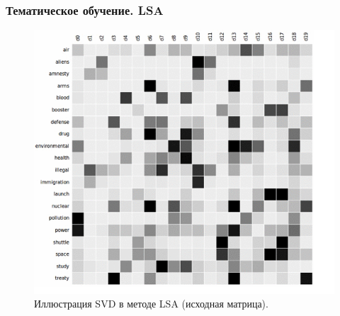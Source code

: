 \documentclass[ucs, notheorems, handout]{beamer}
\begin{document}
		\begin{frame}
	\frametitle{Тематическое обучение. LSA}
	

\begin{figure}[H]
	\begin{center}
		\includegraphics[scale = 0.4]{LSA1.png}
		\caption{Иллюстрация SVD в методе LSA (исходная матрица).}
	\end{center}
\end{figure}

	\end{frame}
	
\end{document}
